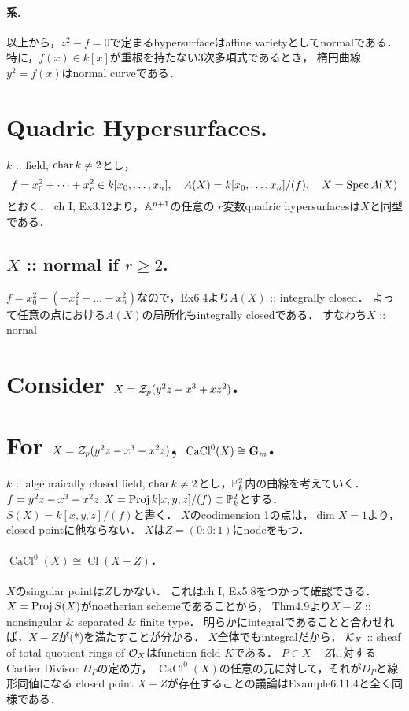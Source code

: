 \documentclass[a4paper]{jsarticle}
\newcommand{\Cl}{\operatorname{Cl}}
\newcommand{\nullCaCl}{\operatorname{CaCl}^{0}}
\begin{document}
    \paragraph{系.}
    以上から，$z^2-f=0$で定まるhypersurfaceはaffine varietyとしてnormalである．
    特に，$f(x) \in k[x]$が重根を持たない$3$次多項式であるとき，
    楕円曲線$y^2=f(x)$はnormal curveである．

\section{Quadric Hypersurfaces.} %
    $k$ :: field, $\operatorname{char} k \neq 2$とし，
    \[
        f=x_0^2+\dots+x_r^2 \in k[x_0, \dots, x_n],~~~
        A(X)=k[x_0,\dots,x_n]/(f),~~~
        X=\operatorname{Spec} A(X)
    \]
    とおく．
    ch I, Ex3.12より，$\mathbb{A}^{n+1}$の任意の
    $r$変数quadric hypersurfacesは$X$と同型である．

    \subsection{$X$ :: normal if $r \geq 2$.}
    $f=x_0^2-(-x_1^2-\dots-x_n^2)$なので，Ex6.4より$A(X)$ :: integrally closed．
    よって任意の点における$A(X)$の局所化もintegrally closedである．
    すなわち$X$ :: nornal

\section{Consider $X=\mathcal{Z}_p(y^2z-x^3+xz^2)$.} %

\section{For $X=\mathcal{Z}_p(y^2z-x^3-x^2z)$, $\nullCaCl(X) \iso \mathbf{G}_m$.} %
    $k$ :: algebraically closed field, $\operatorname{char} k \neq 2$とし，$\mathbb{P}^2_k$内の曲線を考えていく．
    $f=y^2z-x^3-x^2z, X=\operatorname{Proj} k[x,y,z]/(f) \subset \mathbb{P}_k^2$とする．
    $S(X)=k[x,y,z]/(f)$と書く．
    $X$のcodimension 1の点は，$\dim X=1$より，closed pointに他ならない．
    $X$は$Z=(0:0:1)$にnodeをもつ．

    \paragraph{$\nullCaCl(X) \cong \Cl(X-Z)$．}
    $X$のsingular pointは$Z$しかない．
    これはch I, Ex5.8をつかって確認できる．
    $X=\operatorname{Proj} S(X)$がnoetherian schemeであることから，
    Thm4.9より$X-Z$ :: nonsingular \& separated \& finite type．
    明らかにintegralであることと合わせれば，$X-Z$が(*)を満たすことが分かる．
    $X$全体でもintegralだから，
    $\mathcal{K}_X$ :: sheaf of total quotient rings of $\mathcal{O}_X$はfunction field $K$である．
    $P \in X-Z$に対するCartier Divisor $D_P$の定め方，
    $\nullCaCl(X)$の任意の元に対して，それが$D_P$と線形同値になる
    closed point $X-Z$が存在することの議論はExample6.11.4と全く同様である．
\end{document}
